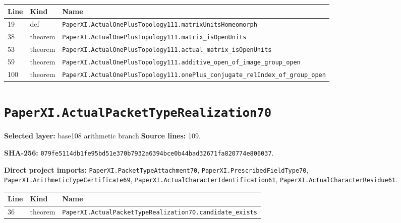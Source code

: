 \documentclass[10pt,oneside]{book}
\begin{document}
\begin{longtable}{@{}p{}p{}p{}@{}}\toprule Line&Kind&Name\\\midrule\endhead

19&def&\nolinkurl{PaperXI.ActualOnePlusTopology111.matrixUnitsHomeomorph}\\

38&theorem&\nolinkurl{PaperXI.ActualOnePlusTopology111.matrix_isOpenUnits}\\

53&theorem&\nolinkurl{PaperXI.ActualOnePlusTopology111.actual_matrix_isOpenUnits}\\

59&theorem&\nolinkurl{PaperXI.ActualOnePlusTopology111.additive_open_of_image_group_open}\\

100&theorem&\nolinkurl{PaperXI.ActualOnePlusTopology111.onePlus_conjugate_relIndex_of_group_open}\\

\bottomrule\end{longtable}

\section{\texorpdfstring{\nolinkurl{PaperXI.ActualPacketTypeRealization70}}{PaperXI.ActualPacketTypeRealization70}}\label{module:PaperXI.ActualPacketTypeRealization70}

\textbf{Selected layer:} base108 arithmetic branch.\quad\textbf{Source lines:} 109.\par\textbf{SHA-256:} {\scriptsize\nolinkurl{079fe5114db1fe95bd51e370b7932a6394bce0b44bad32671fa820774e806037}}.


\textbf{Direct project imports:} \nolinkurl{PaperXI.PacketTypeAttachment70}, \nolinkurl{PaperXI.PrescribedFieldType70}, \nolinkurl{PaperXI.ArithmeticTypeCertificate69}, \nolinkurl{PaperXI.ActualCharacterIdentification61}, \nolinkurl{PaperXI.ActualCharacterResidue61}.

\begin{longtable}{@{}p{}p{}p{}@{}}\toprule Line&Kind&Name\\\midrule\endhead

36&theorem&\nolinkurl{PaperXI.ActualPacketTypeRealization70.candidate_exists}\\

\bottomrule\end{longtable}
\end{document}
